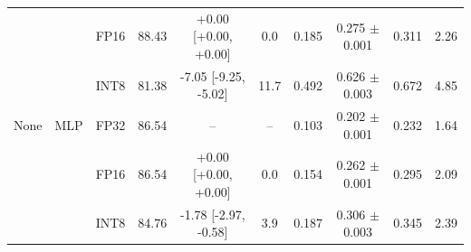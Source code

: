 \begin{table}[t]
\begin{tabular}{lllccccccc}
 &  & FP16 & 88.43 & +0.00 [+0.00, +0.00] & 0.0 & 0.185 & 0.275 $\pm$ 0.001 & 0.311 & 2.26 \\
 &  & INT8 & 81.38 & -7.05 [-9.25, -5.02] & 11.7 & 0.492 & 0.626 $\pm$ 0.003 & 0.672 & 4.85 \\
\addlinespace[2pt]
None & MLP & FP32 & 86.54 & -- & -- & 0.103 & 0.202 $\pm$ 0.001 & 0.232 & 1.64 \\
 &  & FP16 & 86.54 & +0.00 [+0.00, +0.00] & 0.0 & 0.154 & 0.262 $\pm$ 0.001 & 0.295 & 2.09 \\
 &  & INT8 & 84.76 & -1.78 [-2.97, -0.58] & 3.9 & 0.187 & 0.306 $\pm$ 0.003 & 0.345 & 2.39 \\
\bottomrule
\end{tabular}
\end{table}